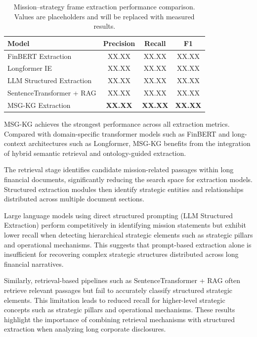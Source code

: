 \documentclass[11pt]{article}
\begin{document}
\begin{table}[h]
\centering
\caption{Mission--strategy frame extraction performance comparison. Values are placeholders and will be replaced with measured results.}
\label{tab:extraction_results}
\begin{tabular}{lccc}
\hline
Model & Precision & Recall & F1 \\
\hline
FinBERT Extraction & XX.XX & XX.XX & XX.XX \\
Longformer IE & XX.XX & XX.XX & XX.XX \\
LLM Structured Extraction & XX.XX & XX.XX & XX.XX \\
SentenceTransformer + RAG & XX.XX & XX.XX & XX.XX \\
MSG-KG Extraction & \textbf{XX.XX} & \textbf{XX.XX} & \textbf{XX.XX} \\
\hline
\end{tabular}
\end{table}

MSG-KG achieves the strongest performance across all extraction metrics. Compared with domain-specific transformer models such as FinBERT and long-context architectures such as Longformer, MSG-KG benefits from the integration of hybrid semantic retrieval and ontology-guided extraction.

The retrieval stage identifies candidate mission-related passages within long financial documents, significantly reducing the search space for extraction models. Structured extraction modules then identify strategic entities and relationships distributed across multiple document sections.

Large language models using direct structured prompting (LLM Structured Extraction) perform competitively in identifying mission statements but exhibit lower recall when detecting hierarchical strategic elements such as strategic pillars and operational mechanisms. This suggests that prompt-based extraction alone is insufficient for recovering complex strategic structures distributed across long financial narratives.

Similarly, retrieval-based pipelines such as SentenceTransformer + RAG often retrieve relevant passages but fail to accurately classify structured strategic elements. This limitation leads to reduced recall for higher-level strategic concepts such as strategic pillars and operational mechanisms. These results highlight the importance of combining retrieval mechanisms with structured extraction when analyzing long corporate disclosures.
\end{document}
